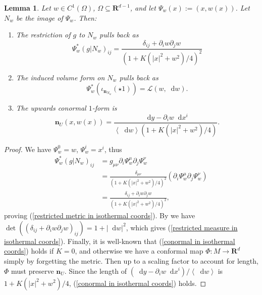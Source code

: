 \documentclass[reqno,10pt]{amsart}
\newcommand{\RR}{\mathbf{R}}
\newcommand*\dif{\mathop{}\!\mathrm{d}}
\newcommand{\Lagrange}{\mathscr L}
\newcommand{\normal}{\mathbf n}
\def\Japan#1{\left \langle #1 \right \rangle}
\newtheorem{lemma}[theorem]{Lemma}
\theoremstyle{definition}
\numberwithin{equation}{section}
\begin{document}
\begin{lemma}\label{Plateau setup lemma}
Let $w \in C^1(\Omega)$, $\Omega \subseteq \RR^{d - 1}$, and let $\Psi_w(x) := (x, w(x))$. Let $N_w$ be the image of $\Psi_w$. Then:
\begin{enumerate}
\item The restriction of $g$ to $N_w$ pulls back as
\begin{equation}\label{restricted metric in isothermal coords}
\Psi_w^*(g|N_w)_{ij} = \frac{\delta_{ij} + \partial_i w \partial_j w}{(1 + K(|x|^2 + w^2)/4)^2}
\end{equation}
\item The induced volume form on $N_w$ pulls back as
\begin{equation}\label{restricted measure in isothermal coords}
\Psi_w^*(\iota_{\normal_{N_w}}(\star 1)) = \Lagrange(w, \dif w).
\end{equation}
\item The upwards conormal $1$-form is
\begin{equation}\label{conormal in isothermal coords}
\normal_U(x, w(x)) = \frac{\dif y - \partial_i w \dif x^i}{\Japan{\dif w}(1 + K(|x|^2 + w^2)/4)}.
\end{equation}
\end{enumerate}
\end{lemma}
\begin{proof}
We have $\Psi_w^0 = w$, $\Psi_w^i = x^i$, thus
\begin{align*}
\Psi_w^*(g|N_w)_{ij} &= g_{\mu\nu} \partial_i \Psi_w^\mu \partial_j \Psi_w^\nu \\
&= \frac{\delta_{\mu\nu}}{(1 + K(|x|^2 + w^2)/4)^2} (\partial_i \Psi_w^\mu \partial_j \Psi_w^\nu) \\
&= \frac{\delta_{ij} + \partial_i w \partial_j w}{(1 + K(|x|^2 + w^2)/4)^2},
\end{align*}
proving (\ref{restricted metric in isothermal coords}).
By \cite[(24)]{Petersen2008} we have $\det((\delta_{ij} + \partial_i w \partial_j w)_{ij}) = 1 + |\dif w|^2$, which gives (\ref{restricted measure in isothermal coords}).
Finally, it is well-known that (\ref{conormal in isothermal coords}) holds if $K = 0$, and otherwise we have a conformal map $\Phi: M \to \RR^d$ simply by forgetting the metric.
Then up to a scaling factor to account for length, $\Phi$ must preserve $\normal_U$.
Since the length of $(\dif y - \partial_i w \dif x^i)/\Japan{\dif w}$ is $1 + K(|x|^2 + w^2)/4$, (\ref{conormal in isothermal coords}) holds.
\end{proof}
\end{document}
